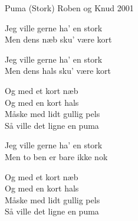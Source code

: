 \begin{song}{Puma (Stork)}{}
  {\SBOrgMel}
  {Roben og Knud}
  {2001}
  {\NotCCLIed}

  \begin{SBVerse}
    Jeg ville gerne ha' en stork\\
    Men dens næb sku' være kort\\
  \end{SBVerse}

  \begin{SBVerse}
    Jeg ville gerne ha' en stork\\
    Men dens hals sku' være kort\\
  \end{SBVerse}

  \begin{SBSection*}
    Og med et kort næb\\
    Og med en kort hals\\
    Måske med lidt gullig pels\\
    Så ville det ligne en puma
  \end{SBSection*}

  \begin{SBChorus}
  \end{SBChorus}

  \begin{SBVerse}
    Jeg ville gerne ha' en stork\\
    Men to ben er bare ikke nok\\
  \end{SBVerse}

  \begin{SBSection*}
    Og med et kort næb\\
    Og med en kort hals\\
    Måske med lidt gullig pels\\
    Så ville det ligne en puma
  \end{SBSection*}

  \begin{SBChorus}
  \end{SBChorus}


\end{song}
